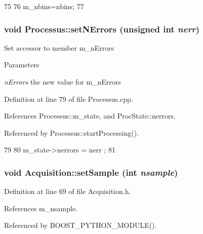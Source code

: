 \begin{DoxyCode}
75                           {
76     m_nbins=nbins;
77   }
\end{DoxyCode}
\hypertarget{classProcessus_a831b027b9cf18ab56fa6147b5d3055da}{
\subsubsection[{setNErrors}]{\setlength{\rightskip}{0pt plus 5cm}void Processus::setNErrors (unsigned int {\em nerr})}}
\label{classProcessus_a831b027b9cf18ab56fa6147b5d3055da}
Set accessor to member m\_\-nErrors 
\begin{DoxyParams}{Parameters}
\item[{\em nErrors}]the new value for m\_\-nErrors \end{DoxyParams}


Definition at line 79 of file Processus.cpp.

References Processus::m\_\-state, and ProcState::nerrors.

Referenced by Processus::startProcessing().


\begin{DoxyCode}
79                                              {
80   m_state->nerrors = nerr ;
81 }
\end{DoxyCode}
\hypertarget{classAcquisition_ade6fd6483b3e3737fe7dcdffb5065954}{
\subsubsection[{setSample}]{\setlength{\rightskip}{0pt plus 5cm}void Acquisition::setSample (int {\em nsample})}}
\label{classAcquisition_ade6fd6483b3e3737fe7dcdffb5065954}


Definition at line 69 of file Acquisition.h.

References m\_\-nsample.

Referenced by BOOST\_\-PYTHON\_\-MODULE().


